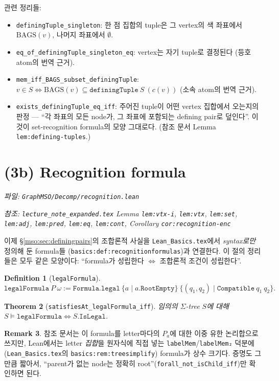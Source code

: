 \documentclass[11pt]{article}
\theoremstyle{definition}
\newtheorem{definition}{Definition}[section]
\newtheorem{remark}[definition]{Remark}
\theoremstyle{plain}
\newtheorem{theorem}[definition]{Theorem}
\newcommand{\lean}[1]{\texttt{#1}}
\newcommand{\leanfile}[1]{\texttt{#1}}
\newcommand{\BAGS}{\mathrm{BAGS}}
\begin{document}
관련 정리들:
\begin{itemize}
  \item \lean{definingTuple\_singleton}: 한 점 집합의 tuple은 그 vertex의 색
    좌표에서 $\BAGS(v)$, 나머지 좌표에서 $\emptyset$.
  \item \lean{eq\_of\_definingTuple\_singleton\_eq}: vertex는 자기 tuple로
    결정된다 (등호 atom의 번역 근거).
  \item \lean{mem\_iff\_BAGS\_subset\_definingTuple}:
    $v \in S \iff \BAGS(v) \subseteq \lean{definingTuple}\ S\ (c(v))$
    (소속 atom의 번역 근거).
  \item \lean{exists\_definingTuple\_eq\_iff}: 주어진 tuple이 어떤 vertex
    집합에서 오는지의 판정 --- ``각 좌표의 모든 node가, 그 좌표에 포함되는
    defining pair로 덮인다''. 이것이 set-recognition formula의 모양 그대로다.
    (참조 문서 Lemma \lean{lem:defining-tuples}.)
\end{itemize}

\section{(3b) Recognition formula}
\label{mso:sec:recognition}

\emph{파일: \leanfile{GraphMSO/Decomp/recognition.lean}}

\emph{참조: \leanfile{lecture\_note\_expanded.tex} Lemma \lean{lem:vtx-i},
\lean{lem:vtx}, \lean{lem:set}, \lean{lem:adj}, \lean{lem:pred}, \lean{lem:eq},
\lean{lem:cont}, Corollary \lean{cor:recognition-enc}}

이제 \S\ref{mso:sec:definingpairs}의 조합론적 사실을
\leanfile{Lean\_Basics.tex}에서 \emph{syntax로만} 정의해 둔 formula들
(\lean{basics:def:recognitionformulas})과 연결한다. 이 절의 정리들은 모두
같은 모양이다: ``formula가 성립한다 $\iff$ 조합론적 조건이 성립한다''.

\begin{definition}[\lean{legalFormula}]
\label{mso:def:legalformula}
\[
  \lean{legalFormula}\ P\ \omega :=
    \lean{Formula.legal}\ \{a \mid a.\lean{RootEmpty}\}\
      \{(q_1,q_2) \mid \lean{Compatible}\ q_1\ q_2\}.
\]
\end{definition}

\begin{theorem}[\lean{satisfiesAt\_legalFormula\_iff}]
\label{mso:thm:legalformula}
임의의 $\Sigma$-tree $S$에 대해 $S \models \lean{legalFormula} \iff S.\lean{IsLegal}$.
\end{theorem}

\begin{remark}
참조 문서는 이 formula를 letter마다의 $P_a$에 대한 이중 유한 논리합으로
쓰지만, Lean에서는 letter \emph{집합}을 원자식에 직접 넣는
\lean{labelMem}/\lean{labelMem₂} 덕분에 (\leanfile{Lean\_Basics.tex}의
\lean{basics:rem:treesimplify}) formula가 상수 크기다. 증명도 그만큼 짧아서,
``parent가 없는 node는 정확히 root''(\lean{forall\_not\_isChild\_iff})만
확인하면 된다.
\end{remark}
\end{document}
